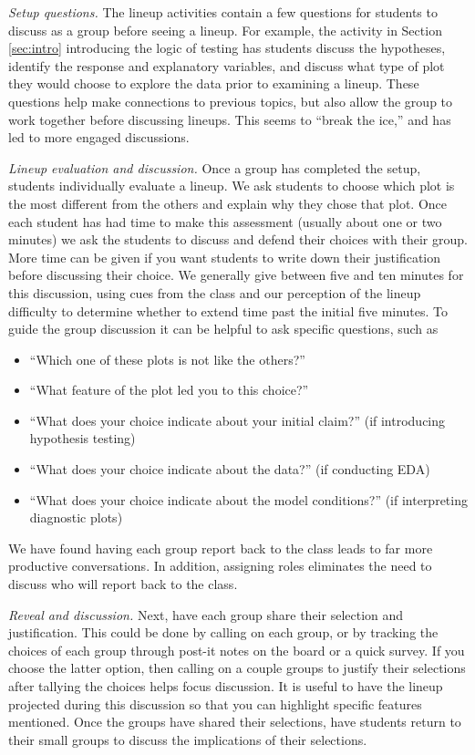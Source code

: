 \documentclass[12pt]{article}
\providecommand{\tightlist}{%
  \setlength{\itemsep}{0pt}\setlength{\parskip}{0pt}}
\begin{document}
\emph{Setup questions.} The lineup activities contain a few questions
for students to discuss as a group before seeing a lineup. For example,
the activity in Section \ref{sec:intro} introducing the logic of testing
has students discuss the hypotheses, identify the response and
explanatory variables, and discuss what type of plot they would choose
to explore the data prior to examining a lineup. These questions help
make connections to previous topics, but also allow the group to work
together before discussing lineups. This seems to ``break the ice,'' and
has led to more engaged discussions.

\emph{Lineup evaluation and discussion.} Once a group has completed the
setup, students individually evaluate a lineup. We ask students to
choose which plot is the most different from the others and explain why
they chose that plot. Once each student has had time to make this
assessment (usually about one or two minutes) we ask the students to
discuss and defend their choices with their group. More time can be
given if you want students to write down their justification before
discussing their choice. We generally give between five and ten minutes
for this discussion, using cues from the class and our perception of the
lineup difficulty to determine whether to extend time past the initial
five minutes. To guide the group discussion it can be helpful to ask
specific questions, such as

\begin{itemize}
\tightlist
\item
  ``Which one of these plots is not like the others?''
\item
  ``What feature of the plot led you to this choice?''
\item
  ``What does your choice indicate about your initial claim?'' (if
  introducing hypothesis testing)
\item
  ``What does your choice indicate about the data?'' (if conducting EDA)
\item
  ``What does your choice indicate about the model conditions?'' (if
  interpreting diagnostic plots)
\end{itemize}

\noindent We have found having each group report back to the class leads
to far more productive conversations. In addition, assigning roles
eliminates the need to discuss who will report back to the class.

\emph{Reveal and discussion.} Next, have each group share their
selection and justification. This could be done by calling on each
group, or by tracking the choices of each group through post-it notes on
the board or a quick survey. If you choose the latter option, then
calling on a couple groups to justify their selections after tallying
the choices helps focus discussion. It is useful to have the lineup
projected during this discussion so that you can highlight specific
features mentioned. Once the groups have shared their selections, have
students return to their small groups to discuss the implications of
their selections.
\end{document}
